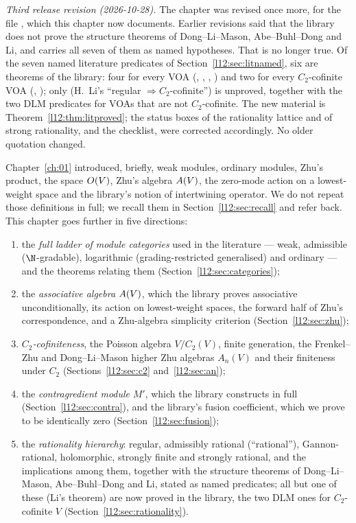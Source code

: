 \emph{Third release revision (2026-10-28).} The chapter was revised once more, for the file , which this chapter now documents. Earlier revisions said that the library does not prove the
structure theorems of Dong--Li--Mason, Abe--Buhl--Dong and Li, and carries all seven of them as named hypotheses. That is no
longer true. Of the seven named literature predicates of Section~\ref{l12:sec:litnamed}, six are theorems of the library: four for
every VOA (, , ,
) and two for every $C_2$-cofinite VOA (,
); only  (H.~Li's ``regular $\Rightarrow C_2$-cofinite'')
is unproved, together with the two DLM predicates for VOAs that are not $C_2$-cofinite. The new material is
Theorem~\ref{l12:thm:litproved}; the status boxes of the rationality lattice and of strong rationality, and the checklist,
were corrected accordingly. No older quotation changed.

Chapter~\ref{ch:01} introduced, briefly, weak modules, ordinary modules, Zhu's product, the space
$O(V)$, Zhu's algebra $A(V)$, the zero-mode action on a lowest-weight space and the
library's notion of intertwining operator. We do not repeat those definitions in full; we recall
them in Section~\ref{l12:sec:recall} and refer back. This chapter goes further in five directions:
\begin{enumerate}
\item the \emph{full ladder of module categories} used in the literature --- weak, admissible
  ($\N$-gradable), logarithmic (grading-restricted generalised) and ordinary --- and the theorems
  relating them (Section~\ref{l12:sec:categories});
\item the \emph{associative algebra} $A(V)$, which the library proves associative
  unconditionally, its action on lowest-weight spaces, the forward half of Zhu's correspondence, and
  a Zhu-algebra simplicity criterion (Section~\ref{l12:sec:zhu});
\item \emph{$C_2$-cofiniteness}, the Poisson algebra $V/C_2(V)$, finite generation, the Frenkel--Zhu
  and Dong--Li--Mason higher Zhu algebras $A_n(V)$ and their finiteness under $C_2$
  (Sections~\ref{l12:sec:c2} and~\ref{l12:sec:an});
\item the \emph{contragredient module} $M'$, which the library constructs in full
  (Section~\ref{l12:sec:contra}), and the library's fusion coefficient, which we prove to be
  identically zero (Section~\ref{l12:sec:fusion});
\item the \emph{rationality hierarchy}: regular, admissibly rational (``rational''),
  Gannon-rational, holomorphic, strongly finite and strongly rational, and the implications among
  them, together with the structure theorems of Dong--Li--Mason, Abe--Buhl--Dong and Li, stated as named predicates;
  all but one of these (Li's theorem) are now proved in the library, the two DLM ones for $C_2$-cofinite $V$
  (Section~\ref{l12:sec:rationality}).
\end{enumerate}

